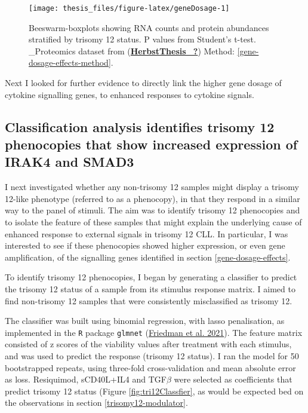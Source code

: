 \documentclass[11pt, a4paper, twosided]{book}
\begin{document}
\begin{figure}

{\centering \texttt{[image: thesis\_files/figure-latex/geneDosage-1]} 

}

\caption{Beeswarm-boxplots showing RNA counts and protein abundances stratified by trisomy 12 status. P values from Student's t-test. \_Proteomics dataset from (\protect\hyperlink{ref-HerbstThesis_}{\textbf{HerbstThesis\_?}}) Method: \ref{gene-dosage-effects-method}.}\label{fig:geneDosage}
\end{figure}
Next I looked for further evidence to directly link the higher gene dosage of cytokine signalling genes, to enhanced responses to cytokine signals.

\hypertarget{trisomy12-classifier}{%
\subsection{Classification analysis identifies trisomy 12 phenocopies that show increased expression of IRAK4 and SMAD3}\label{trisomy12-classifier}}

I next investigated whether any non-trisomy 12 samples might display a trisomy 12-like phenotype (referred to as a phenocopy), in that they respond in a similar way to the panel of stimuli. The aim was to identify trisomy 12 phenocopies and to isolate the feature of these samples that might explain the underlying cause of enhanced response to external signals in trisomy 12 CLL. In particular, I was interested to see if these phenocopies showed higher expression, or even gene amplification, of the signalling genes identified in section \ref{gene-dosage-effects}.

To identify trisomy 12 phenocopies, I began by generating a classifier to predict the trisomy 12 status of a sample from its stimulus response matrix. I aimed to find non-trisomy 12 samples that were consistently misclassified as trisomy 12.

The classifier was built using binomial regression, with lasso penalisation, as implemented in the \texttt{R} package \texttt{glmnet} (\protect\hyperlink{ref-R-glmnet}{Friedman et al. 2021}). The feature matrix consisted of z scores of the viability values after treatment with each stimulus, and was used to predict the response (trisomy 12 status). I ran the model for 50 bootstrapped repeats, using three-fold cross-validation and mean absolute error as loss. Resiquimod, sCD40L+IL4 and TGF\(\beta\) were selected as coefficients that predict trisomy 12 status (Figure \ref{fig:tri12Classfier}, as would be expected bed on the observations in section \ref{trisomy12-modulator}.
\end{document}
